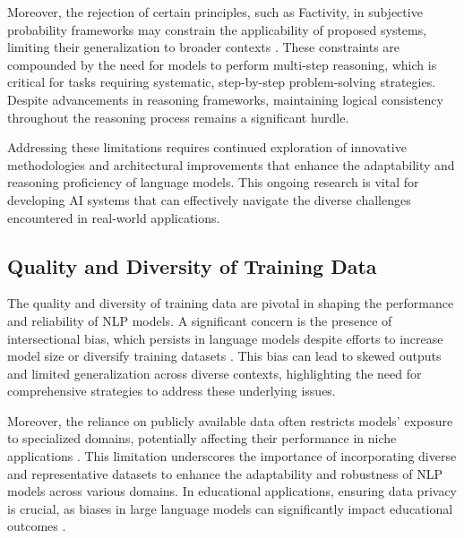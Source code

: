 Moreover, the rejection of certain principles, such as Factivity, in subjective probability frameworks may constrain the applicability of proposed systems, limiting their generalization to broader contexts \cite{cieslinski2022axiomstypefreesubjectiveprobability}. These constraints are compounded by the need for models to perform multi-step reasoning, which is critical for tasks requiring systematic, step-by-step problem-solving strategies. Despite advancements in reasoning frameworks, maintaining logical consistency throughout the reasoning process remains a significant hurdle.



Addressing these limitations requires continued exploration of innovative methodologies and architectural improvements that enhance the adaptability and reasoning proficiency of language models. This ongoing research is vital for developing AI systems that can effectively navigate the diverse challenges encountered in real-world applications.



\subsection{Quality and Diversity of Training Data} \label{subsec:Quality and Diversity of Training Data}

The quality and diversity of training data are pivotal in shaping the performance and reliability of NLP models. A significant concern is the presence of intersectional bias, which persists in language models despite efforts to increase model size or diversify training datasets \cite{magee2021intersectionalbiascausallanguage}. This bias can lead to skewed outputs and limited generalization across diverse contexts, highlighting the need for comprehensive strategies to address these underlying issues.



Moreover, the reliance on publicly available data often restricts models' exposure to specialized domains, potentially affecting their performance in niche applications \cite{touvron2023llama}. This limitation underscores the importance of incorporating diverse and representative datasets to enhance the adaptability and robustness of NLP models across various domains. In educational applications, ensuring data privacy is crucial, as biases in large language models can significantly impact educational outcomes \cite{kasneci2023chatgpt}.



